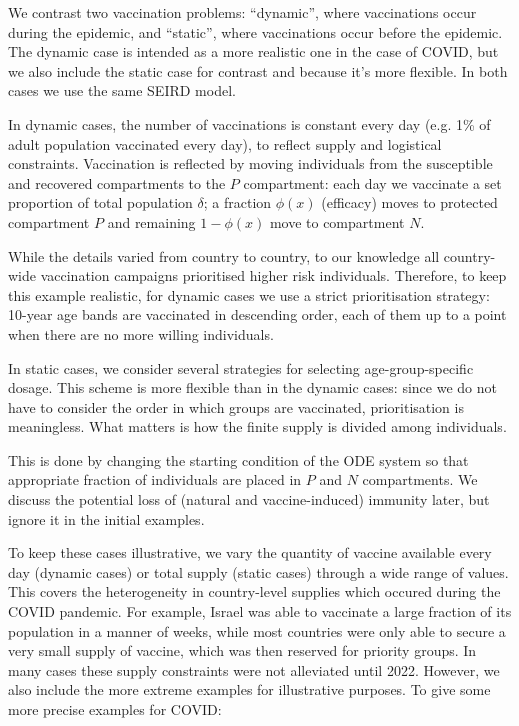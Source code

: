 \documentclass[12pt]{article}
\begin{document}
We contrast two vaccination problems: ``dynamic'', where vaccinations occur during the epidemic, and ``static'', where vaccinations occur before the epidemic. The dynamic case is intended as a more realistic one in the case of COVID, but we also include the static case for contrast and because it's more flexible. In both cases we use the same SEIRD model.

In dynamic cases, the number of vaccinations is constant every day (e.g. 1\% of adult population vaccinated every day), to reflect supply and logistical constraints. Vaccination is reflected by moving individuals from the susceptible and recovered compartments to the $P$ compartment: each day we vaccinate a set proportion of total population $\delta$; a fraction $\phi(x)$ (efficacy) moves to protected compartment $P$ and remaining $1-\phi(x)$ move to compartment $N$.

While the details varied from country to country, to our knowledge all country-wide vaccination campaigns prioritised higher risk individuals. Therefore, to keep this example realistic, for dynamic cases we use a strict prioritisation strategy: 10-year age bands are vaccinated in descending order, each of them up to a point when there are no more willing individuals. 

In static cases, we consider several strategies for selecting age-group-specific dosage. This scheme is more flexible than in the dynamic cases: since we do not have to consider the order in which groups are vaccinated, prioritisation is meaningless. What matters is how the finite supply is divided among individuals.

This is done by changing the starting condition of the ODE system so that appropriate fraction of individuals are placed in $P$ and $N$ compartments. We discuss the potential loss of (natural and vaccine-induced) immunity later, but ignore it in the initial examples.

To keep these cases illustrative, we vary the quantity of vaccine available every day (dynamic cases) or total supply (static cases) through a wide range of values. This covers the heterogeneity in country-level supplies which occured during the COVID pandemic. For example, Israel was able to vaccinate a large fraction of its population in a manner of weeks, while most countries were only able to secure a very small supply of vaccine, which was then reserved for priority groups. In many cases these supply constraints were not alleviated until 2022. However, we also include the more extreme examples for illustrative purposes. To give some more precise examples for COVID:
\end{document}
